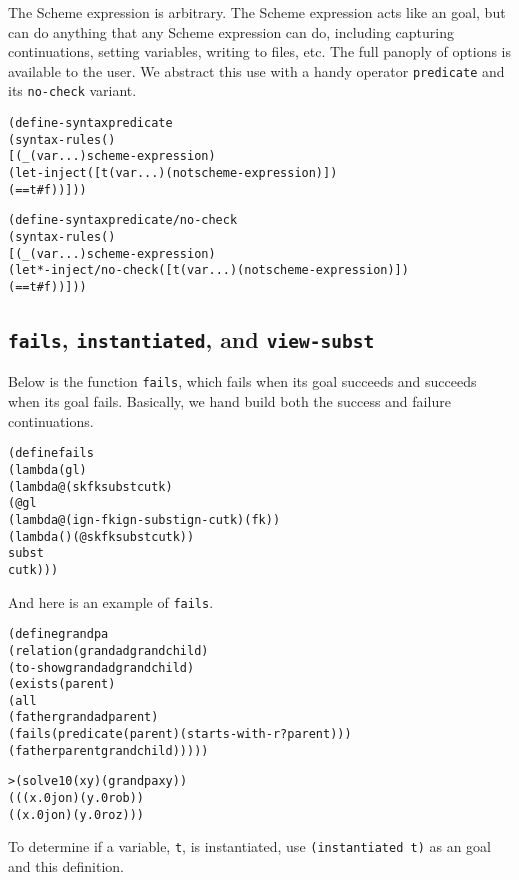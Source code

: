 The Scheme expression is arbitrary.  The Scheme expression acts like an
goal, but can do anything that any Scheme expression can do, including
capturing continuations, setting variables, writing to files, etc.  The
full panoply of options is available to the user.  We abstract this use
with a handy operator \texttt{predicate} and its \texttt{no-check} variant.

\begin{alltt}
(define-syntax predicate
  (syntax-rules ()
    [(_ (var ...) scheme-expression)
     (let-inject ([t (var ...) (not scheme-expression)])
       (== t #f))]))

(define-syntax predicate/no-check
  (syntax-rules ()
    [(_ (var ...) scheme-expression)
     (let*-inject/no-check ([t (var ...) (not scheme-expression)])
       (== t #f))]))
\end{alltt}

\subsection{\texttt{fails}, \texttt{instantiated}, and \texttt{view-subst}}

Below is the function \texttt{fails}, which fails when its goal succeeds and
succeeds when its goal fails.  Basically, we hand build both the success
and failure continuations.

\begin{alltt}
(define fails
  (lambda (gl)
    (lambda@ (sk fk subst cutk)
      (@ gl
        (lambda@ (ign-fk ign-subst ign-cutk) (fk))
        (lambda () (@ sk fk subst cutk))
        subst
        cutk)))
\end{alltt}

\noindent
And here is an example of \texttt{fails}.

\begin{alltt}
(define grandpa
  (relation (grandad grandchild)
    (to-show grandad grandchild)
    (exists (parent)
      (all
        (father grandad parent)
        (fails (predicate (parent) (starts-with-r? parent)))
        (father parent grandchild)))))
\end{alltt}

\begin{alltt}
> (solve 10 (x y) (grandpa x y))
(((x.0 jon) (y.0 rob))
 ((x.0 jon) (y.0 roz)))
\end{alltt}

To determine if a variable, \texttt{t}, is instantiated, use
\texttt{(instantiated t)} as an goal and this definition.

